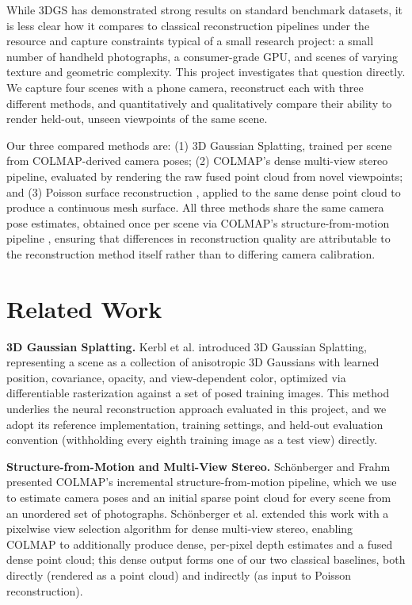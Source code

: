 \documentclass[conference]{IEEEtran}
\begin{document}
While 3DGS has demonstrated strong results on standard benchmark datasets, it is less clear how it compares to classical reconstruction pipelines under the resource and capture constraints typical of a small research project: a small number of handheld photographs, a consumer-grade GPU, and scenes of varying texture and geometric complexity. This project investigates that question directly. We capture four scenes with a phone camera, reconstruct each with three different methods, and quantitatively and qualitatively compare their ability to render held-out, unseen viewpoints of the same scene.

Our three compared methods are: (1) 3D Gaussian Splatting, trained per scene from COLMAP-derived camera poses; (2) COLMAP's dense multi-view stereo pipeline, evaluated by rendering the raw fused point cloud from novel viewpoints; and (3) Poisson surface reconstruction \cite{kazhdan2013screened}, applied to the same dense point cloud to produce a continuous mesh surface. All three methods share the same camera pose estimates, obtained once per scene via COLMAP's structure-from-motion pipeline \cite{schonberger2016sfm}, ensuring that differences in reconstruction quality are attributable to the reconstruction method itself rather than to differing camera calibration.

\section{Related Work}

\textbf{3D Gaussian Splatting.} Kerbl et al. \cite{kerbl2023splatting} introduced 3D Gaussian Splatting, representing a scene as a collection of anisotropic 3D Gaussians with learned position, covariance, opacity, and view-dependent color, optimized via differentiable rasterization against a set of posed training images. This method underlies the neural reconstruction approach evaluated in this project, and we adopt its reference implementation, training settings, and held-out evaluation convention (withholding every eighth training image as a test view) directly.

\textbf{Structure-from-Motion and Multi-View Stereo.} Schönberger and Frahm \cite{schonberger2016sfm} presented COLMAP's incremental structure-from-motion pipeline, which we use to estimate camera poses and an initial sparse point cloud for every scene from an unordered set of photographs. Schönberger et al. \cite{schonberger2016mvs} extended this work with a pixelwise view selection algorithm for dense multi-view stereo, enabling COLMAP to additionally produce dense, per-pixel depth estimates and a fused dense point cloud; this dense output forms one of our two classical baselines, both directly (rendered as a point cloud) and indirectly (as input to Poisson reconstruction).
\end{document}
